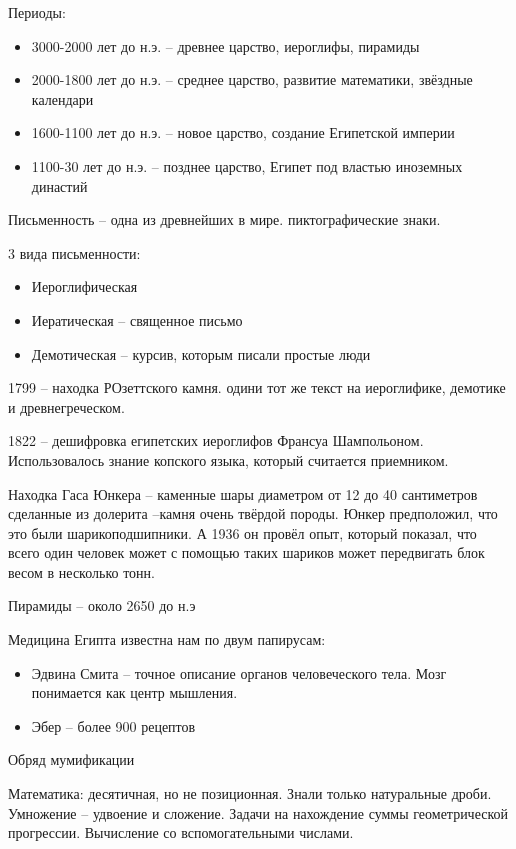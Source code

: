 \documentclass{book}
\theoremstyle{definition}
\begin{document}
   Периоды:
   \begin{itemize}
       \item 3000-2000 лет до н.э. -- древнее царство, иероглифы, пирамиды
       \item 2000-1800 лет до н.э. -- среднее царство, развитие математики, звёздные календари
       \item 1600-1100 лет до н.э. -- новое царство, создание Египетской империи
       \item 1100-30 лет  до н.э. -- позднее царство, Египет под властью иноземных династий
   \end{itemize}

   Письменность -- одна из древнейших в мире. пиктографические знаки.

   3 вида письменности:
   \begin{itemize}
       \item Иероглифическая
       \item Иератическая -- священное письмо
       \item Демотическая -- курсив, которым писали простые люди
   \end{itemize}

   1799 -- находка РОзеттского камня. одини тот же текст на иероглифике, демотике и древнегреческом.

   1822 -- дешифровка египетских иероглифов Франсуа Шампольоном. Использовалось знание копского языка, который считается приемником.

   Находка Гаса Юнкера -- каменные шары диаметром от 12 до 40 сантиметров сделанные из долерита --камня очень твёрдой породы. Юнкер предположил, что это были шарикоподшипники. А 1936 он провёл опыт, который показал, что всего один человек может с помощью таких шариков может передвигать блок весом в несколько тонн.

   Пирамиды -- около 2650 до н.э

   Медицина Египта известна нам по двум папирусам:
   \begin{itemize}
       \item Эдвина Смита -- точное описание органов человеческого тела. Мозг понимается как центр мышления.
       \item Эбер -- более 900 рецептов
   \end{itemize}

   Обряд мумификации

   Математика: десятичная, но не позиционная. Знали только натуральные дроби. Умножение -- удвоение и сложение. Задачи на нахождение суммы геометрической прогрессии. Вычисление со вспомогательными числами.
\end{document}

